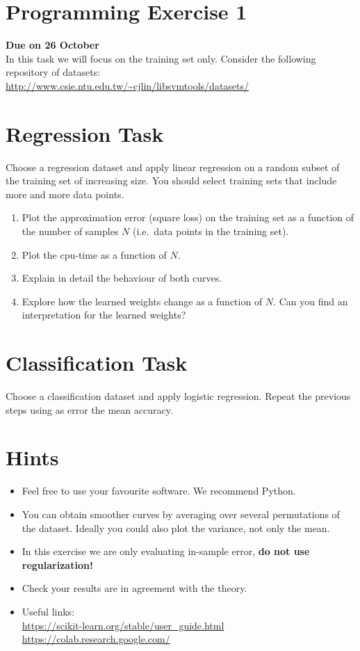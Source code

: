 \documentclass{article}
\begin{document}
  \section*{Programming Exercise 1}

  {\bf Due on 26 October}\\


In this task we will focus on the training set only.
Consider the following repository of datasets:\\

\noindent
\url{http://www.csie.ntu.edu.tw/~cjlin/libsvmtools/datasets/}\\

\noindent

\section{Regression Task}

Choose a regression dataset and apply linear regression on a random subset of the training set of increasing size. You should select training sets that include more and more data points.
\begin{enumerate}
\item Plot the approximation error (square loss) on the training set as a function of the number of samples $N$ (i.e.~data points in the training set). %
\item Plot the cpu-time as a function of $N$.
\item Explain in detail the behaviour of both curves.
\item Explore how the learned weights change as a function of $N$.
Can you find an interpretation for the learned weights?
\end{enumerate}

\section{Classification Task}

Choose a classification dataset and apply logistic regression.
Repeat the previous steps using as error the mean accuracy.


\section{Hints}
\begin{itemize}
\item Feel free to use your favourite software. We recommend Python.
\item You can obtain smoother curves by averaging over several permutations of the dataset.
Ideally you could also plot the variance, not only the mean.
\item In this exercise we are only evaluating in-sample error, \textbf{do not use regularization!}
\item Check your results are in agreement with the theory.
\item Useful links:
\\
\noindent
\url{https://scikit-learn.org/stable/user_guide.html}\\
\url{https://colab.research.google.com/}\\
\end{itemize}
\end{document}
